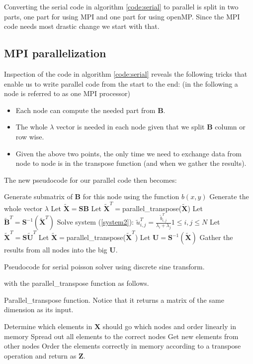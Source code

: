 Converting the serial code in algorithm \ref{code:serial} to parallel is split in two parts, one part for using MPI and one part for using openMP. Since the MPI code needs most drastic change we start with that.

\subsection*{MPI parallelization}
Inspection of the code in algorithm \ref{code:serial} reveals the following tricks that enable us to write parallel code from the start to the end: (in the following a node is referred to as one MPI processor)
\begin{itemize}
\item Each node can compute the needed part from $\textbf{B}$.
\item The whole $\lambda$ vector is needed in each node given that we split $\textbf{B}$ column or row wise.
\item Given the above two points, the only time we need to exchange data from node to node is in the transpose function (and when we gather the results).
\end{itemize}
The new pseudocode for our parallel code then becomes:\\
\begin{algorithm}[H]
 Generate submatrix of $\textbf{B}$ for this node using the function $b(x,y)$\;
 Generate the whole vector $\lambda$ \;
 Let $\mathbf{\widetilde{X}} = \mathbf{SB}$  \;
 Let $\mathbf{\widetilde{X}}^T = $parallel\_transpose($\mathbf{\widetilde{X}}$)   \;
 Let $\mathbf{\widetilde{B}}^T = \mathbf{S}^{-1}(\mathbf{\widetilde{X}}^T)$ \;
 Solve system (\ref{system2}): $\tilde{u}^T_{i,j} = \frac{\tilde{b}^T_{i,j}}{\lambda_i + \lambda_j} 1 \leq i, j \leq N$\;
 Let $\mathbf{\widetilde{X}}^T = \mathbf{S}\mathbf{\tilde{U}}^T$  \;
 Let $\mathbf{\widetilde{X}} = $parallel\_transpose($\mathbf{\widetilde{X}}^T$)   \;
 Let $\mathbf{U} = \mathbf{S}^{-1}(\mathbf{\widetilde{X}}) $ \;
 Gather the results from all nodes into the big $\mathbf{U}$.
 \caption{Pseudocode for serial poisson solver using discrete sine transform.}
 \label{code:parallel}
\end{algorithm}
\noindent with the parallel\_transpose function as follows.\\
\begin{algorithm}[H]
 \caption{Parallel\_transpose function. Notice that it returns a matrix of the same dimension as its input.}
 Determine which elements in $\mathbf{X}$ should go which nodes and order linearly in memory \;
 Spread out all elements to the correct nodes \;
 Get new elements from other nodes \;
 Order the elements correctly in memory according to a transpose operation and return as $\mathbf{Z}$.
 \label{code:transpose}
\end{algorithm}
